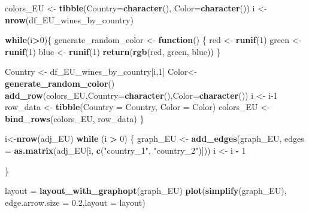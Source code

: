 \documentclass[
]{article}
\newenvironment{Shaded}{\begin{snugshade}}{\end{snugshade}}
\newcommand{\AttributeTok}[1]{\textcolor[rgb]{0.13,0.29,0.53}{#1}}
\newcommand{\ControlFlowTok}[1]{\textcolor[rgb]{0.13,0.29,0.53}{\textbf{#1}}}
\newcommand{\DecValTok}[1]{\textcolor[rgb]{0.00,0.00,0.81}{#1}}
\newcommand{\FloatTok}[1]{\textcolor[rgb]{0.00,0.00,0.81}{#1}}
\newcommand{\FunctionTok}[1]{\textcolor[rgb]{0.13,0.29,0.53}{\textbf{#1}}}
\newcommand{\NormalTok}[1]{#1}
\newcommand{\OtherTok}[1]{\textcolor[rgb]{0.56,0.35,0.01}{#1}}
\newcommand{\SpecialCharTok}[1]{\textcolor[rgb]{0.81,0.36,0.00}{\textbf{#1}}}
\newcommand{\StringTok}[1]{\textcolor[rgb]{0.31,0.60,0.02}{#1}}
\begin{document}
\begin{Shaded}
\begin{Highlighting}[]
\NormalTok{colors\_EU }\OtherTok{\textless{}{-}} \FunctionTok{tibble}\NormalTok{(}\AttributeTok{Country=}\FunctionTok{character}\NormalTok{(), }\AttributeTok{Color=}\FunctionTok{character}\NormalTok{())}
\NormalTok{i }\OtherTok{\textless{}{-}} \FunctionTok{nrow}\NormalTok{(df\_EU\_wines\_by\_country)}

\ControlFlowTok{while}\NormalTok{(i}\SpecialCharTok{\textgreater{}}\DecValTok{0}\NormalTok{)\{}
\NormalTok{  generate\_random\_color }\OtherTok{\textless{}{-}} \ControlFlowTok{function}\NormalTok{() \{}
\NormalTok{  red }\OtherTok{\textless{}{-}} \FunctionTok{runif}\NormalTok{(}\DecValTok{1}\NormalTok{)}
\NormalTok{  green }\OtherTok{\textless{}{-}} \FunctionTok{runif}\NormalTok{(}\DecValTok{1}\NormalTok{)}
\NormalTok{  blue }\OtherTok{\textless{}{-}} \FunctionTok{runif}\NormalTok{(}\DecValTok{1}\NormalTok{)}
  \FunctionTok{return}\NormalTok{(}\FunctionTok{rgb}\NormalTok{(red, green, blue))}
\NormalTok{  \}}
  
\NormalTok{  Country }\OtherTok{\textless{}{-}}\NormalTok{ df\_EU\_wines\_by\_country[i,}\DecValTok{1}\NormalTok{]}
\NormalTok{  Color}\OtherTok{\textless{}{-}}\FunctionTok{generate\_random\_color}\NormalTok{()}
  \FunctionTok{add\_row}\NormalTok{(colors\_EU,}\AttributeTok{Country=}\FunctionTok{character}\NormalTok{(),}\AttributeTok{Color=}\FunctionTok{character}\NormalTok{())}
\NormalTok{  i }\OtherTok{\textless{}{-}}\NormalTok{ i}\DecValTok{{-}1}
\NormalTok{  row\_data }\OtherTok{\textless{}{-}} \FunctionTok{tibble}\NormalTok{(}\AttributeTok{Country =}\NormalTok{ Country, }\AttributeTok{Color =}\NormalTok{ Color)}
\NormalTok{  colors\_EU }\OtherTok{\textless{}{-}} \FunctionTok{bind\_rows}\NormalTok{(colors\_EU, row\_data)}
\NormalTok{\}}

\NormalTok{i}\OtherTok{\textless{}{-}}\FunctionTok{nrow}\NormalTok{(adj\_EU)}
\ControlFlowTok{while}\NormalTok{ (i }\SpecialCharTok{\textgreater{}} \DecValTok{0}\NormalTok{) \{}
\NormalTok{  graph\_EU }\OtherTok{\textless{}{-}} \FunctionTok{add\_edges}\NormalTok{(graph\_EU, }\AttributeTok{edges =} \FunctionTok{as.matrix}\NormalTok{(adj\_EU[i, }\FunctionTok{c}\NormalTok{(}\StringTok{"country\_1"}\NormalTok{, }\StringTok{"country\_2"}\NormalTok{)]))}
\NormalTok{  i }\OtherTok{\textless{}{-}}\NormalTok{ i }\SpecialCharTok{{-}} \DecValTok{1}
  
\NormalTok{\}}


\NormalTok{layout }\OtherTok{=} \FunctionTok{layout\_with\_graphopt}\NormalTok{(graph\_EU)}
\FunctionTok{plot}\NormalTok{(}\FunctionTok{simplify}\NormalTok{(graph\_EU), }\AttributeTok{edge.arrow.size =} \FloatTok{0.2}\NormalTok{,}\AttributeTok{layout =}\NormalTok{ layout)}
\end{Highlighting}
\end{Shaded}
\end{document}
